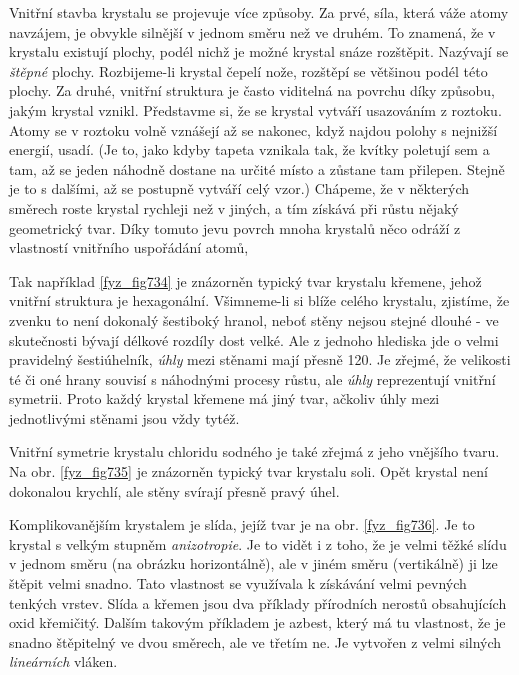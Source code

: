    Vnitřní stavba krystalu se projevuje více způsoby. Za prvé, síla, která váže atomy navzájem, je 
    obvykle silnější v jednom směru než ve druhém. To znamená, že v krystalu existují plochy, podél 
    nichž je možné krystal snáze rozštěpit. Nazývají se \emph{štěpné} plochy. Rozbijeme-li krystal 
    čepelí nože, rozštěpí se většinou podél této plochy. Za druhé, vnitřní struktura je často 
    viditelná na povrchu díky způsobu, jakým krystal vznikl. Představme si, že se krystal vytváří 
    usazováním z roztoku. Atomy se v roztoku volně vznášejí až se nakonec, když najdou polohy s 
    nejnižší energií, usadí. (Je to, jako kdyby tapeta vznikala tak, že kvítky poletují sem a tam, 
    až se jeden náhodně dostane na určité místo a zůstane tam přilepen. Stejně je to s dalšími, až 
    se postupně vytváří celý vzor.) Chápeme, že v některých směrech roste krystal rychleji než v 
    jiných, a tím získává při růstu nějaký geometrický tvar. Díky tomuto jevu povrch mnoha krystalů 
    něco odráží z vlastností vnitřního uspořádání atomů,
    
    Tak například \ref{fyz_fig734} je znázorněn typický tvar krystalu křemene, jehož vnitřní 
    struktura je hexagonální. Všimneme-li si blíže celého krystalu, zjistíme, že zvenku to není 
    dokonalý šestiboký hranol, neboť stěny nejsou stejné dlouhé - ve skutečnosti bývají délkové 
    rozdíly dost velké. Ale z jednoho hlediska jde o velmi pravidelný šestiúhelník, \emph{úhly} 
    mezi stěnami mají přesně \SI{120}{\deg}. Je zřejmé, že velikosti té či oné hrany souvisí s 
    náhodnými procesy růstu, ale \emph{úhly} reprezentují vnitřní symetrii. Proto každý krystal 
    křemene má jiný tvar, ačkoliv úhly mezi jednotlivými stěnami jsou vždy tytéž. 
    
    Vnitřní symetrie krystalu chloridu sodného je také zřejmá z jeho vnějšího tvaru. Na obr. 
    \ref{fyz_fig735} je znázorněn typický tvar krystalu soli. Opět krystal není dokonalou krychlí, 
    ale stěny svírají přesně pravý úhel. 
    
    Komplikovanějším krystalem je slída, jejíž tvar je na obr. \ref{fyz_fig736}. Je to krystal s 
    velkým stupněm \emph{anizotropie}. Je to vidět i z toho, že je velmi těžké slídu v jednom směru 
    (na obrázku horizontálně), ale v jiném směru (vertikálně) ji lze štěpit velmi snadno. Tato 
    vlastnost se využívala k získávání velmi pevných tenkých vrstev. Slída a křemen jsou dva 
    příklady přírodních nerostů obsahujících oxid křemičitý. Dalším takovým příkladem je azbest, 
    který má tu vlastnost, že je snadno štěpitelný ve dvou směrech, ale ve třetím ne. Je vytvořen z 
    velmi silných \emph{lineárních} vláken. 
    
